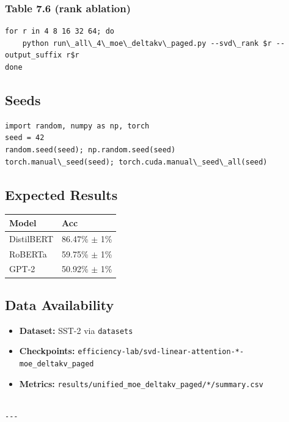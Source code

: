 \subsubsection{Table 7.6 (rank ablation)}
\begin{lstlisting}
for r in 4 8 16 32 64; do
    python run\_all\_4\_moe\_deltakv\_paged.py --svd\_rank $r --output_suffix r$r
done
\end{lstlisting}

\subsection{Seeds}

\begin{lstlisting}
import random, numpy as np, torch
seed = 42
random.seed(seed); np.random.seed(seed)
torch.manual\_seed(seed); torch.cuda.manual\_seed\_all(seed)
\end{lstlisting}

\subsection{Expected Results}

\begin{table}[H]
\centering
\small
\begin{tabular}{ll}
\toprule
\textbf{Model} & \textbf{Acc} \\
\midrule
DistilBERT & 86.47\% $\pm$ 1\% \\
RoBERTa & 59.75\% $\pm$ 1\% \\
GPT-2 & 50.92\% $\pm$ 1\% \\
\bottomrule
\end{tabular}
\end{table}

\subsection{Data Availability}

\begin{itemize}
\item \textbf{Dataset:} SST-2 via \texttt{datasets}
\item \textbf{Checkpoints:} \texttt{efficiency-lab/svd-linear-attention-*-moe\_deltakv\_paged}
\item \textbf{Metrics:} \texttt{results/unified\_moe\_deltakv\_paged/*/summary.csv}
\end{itemize}
\begin{lstlisting}

---
\end{lstlisting}